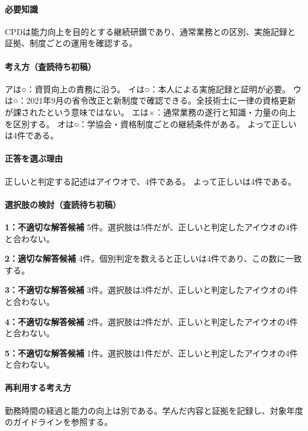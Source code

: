 \paragraph{必要知識} CPDは能力向上を目的とする継続研鑚であり、通常業務との区別、実施記録と証拠、制度ごとの運用を確認する。

\paragraph{考え方（査読待ち初稿）} アは○：資質向上の責務に沿う。 イは○：本人による実施記録と証明が必要。 ウは○：2021年9月の省令改正と新制度で確認できる。全技術士に一律の資格更新が課されたという意味ではない。 エは×：通常業務の遂行と知識・力量の向上を区別する。 オは○：学協会・資格制度ごとの継続条件がある。 よって正しいは4件である。

\paragraph{正答を選ぶ理由} 正しいと判定する記述はアイウオで、4件である。  よって正しいは4件である。

\paragraph{選択肢の検討（査読待ち初稿）}\mbox{}\par

\noindent\textbf{1：不適切な解答候補} 5件。選択肢は5件だが、正しいと判定したアイウオの4件と合わない。\par

\noindent\textbf{2：適切な解答候補} 4件。個別判定を数えると正しいは4件であり、この数に一致する。\par

\noindent\textbf{3：不適切な解答候補} 3件。選択肢は3件だが、正しいと判定したアイウオの4件と合わない。\par

\noindent\textbf{4：不適切な解答候補} 2件。選択肢は2件だが、正しいと判定したアイウオの4件と合わない。\par

\noindent\textbf{5：不適切な解答候補} 1件。選択肢は1件だが、正しいと判定したアイウオの4件と合わない。\par

\paragraph{再利用する考え方} 勤務時間の経過と能力の向上は別である。学んだ内容と証拠を記録し、対象年度のガイドラインを参照する。

